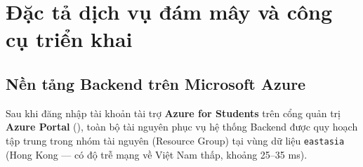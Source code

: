 \section{Đặc tả dịch vụ đám mây và công cụ triển khai}
\label{sec:dac_ta_dich_vu}

\subsection{Nền tảng Backend trên Microsoft Azure}
\label{subsec:nen_tang_azure}

Sau khi đăng nhập tài khoản tài trợ \textbf{Azure for Students} trên cổng quản trị \textbf{Azure Portal} (), toàn bộ tài nguyên phục vụ hệ thống Backend được quy hoạch tập trung trong nhóm tài nguyên (Resource Group)  tại vùng dữ liệu \texttt{eastasia} (Hong Kong — có độ trễ mạng về Việt Nam thấp, khoảng 25--35 ms).

